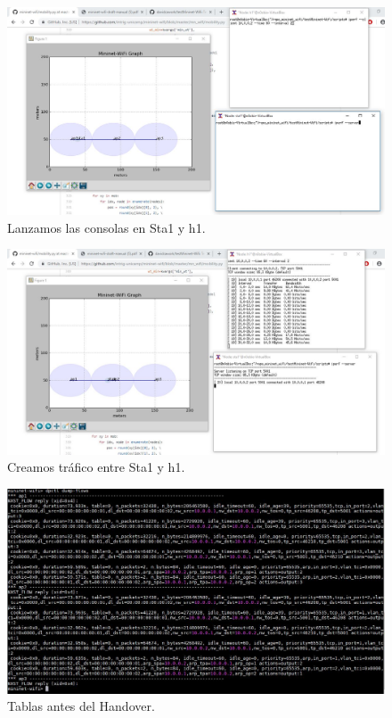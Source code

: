 \newpage
\begin{figure}[!htb]
  \centering
    \includegraphics[width=\linewidth]{./img/23.JPG}
    \caption{Lanzamos las consolas en Sta1 y h1.}
  \label{fig:yo}
\end{figure}
\begin{figure}[!htb]
  \centering
    \includegraphics[width=\linewidth]{./img/24.JPG}
    \caption{Creamos tráfico entre Sta1 y h1.}
  \label{fig:yo}
\end{figure}
\newpage
\begin{figure}[!htb]
  \centering
    \includegraphics[width=\linewidth]{./img/25.JPG}
    \caption{Tablas antes del Handover.}
  \label{fig:yo}
\end{figure}
